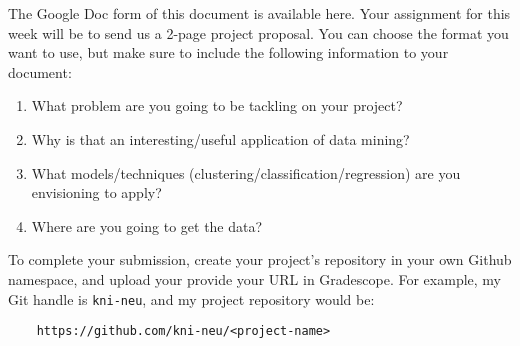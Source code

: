 \documentclass[paper=a4, fontsize=11pt]{scrartcl} %
\author{
    \textbf{YOUR NAME} \\ 
    \textbf{YOUR GIT USERNAME} \\ 
    \textbf{YOUR E-MAIL}
}%
\begin{document}
\maketitle %


The Google Doc form of this document is available here. Your assignment for this week will be to send us a 2-page project proposal. You can choose the format you want to use, but make sure to include the following information to your document:


\begin{enumerate}
    \item What problem are you going to be tackling on your project?
    \item Why is that an interesting/useful application of data mining?
    \item What models/techniques (clustering/classification/regression) are you envisioning to apply?
    \item Where are you going to get the data?
\end{enumerate}

To complete your submission, create your project's repository in your own Github namespace, and upload your provide your URL in Gradescope. For example, my Git handle is \verb"kni-neu", and my project repository would be:

\begin{verbatim}
    https://github.com/kni-neu/<project-name>
\end{verbatim}
\end{document}
